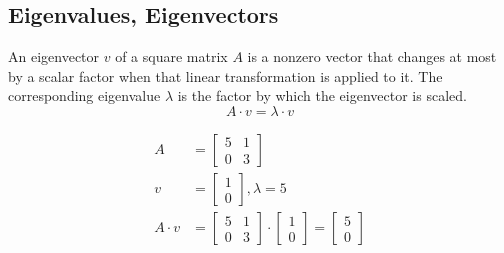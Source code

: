 \subsection{Eigenvalues, Eigenvectors}\label{eigen}
An eigenvector \( v \) of a square matrix \(A\) is a nonzero vector that changes at most by a scalar factor when that linear transformation is applied to it. The corresponding eigenvalue $\lambda$ is the factor by which the eigenvector is scaled.
\begin{equation} \label{eigenexpression}
    A\cdot v = \lambda \cdot v
\end{equation}
\begin{example}
    \begin{align*}
        A         & = \begin{bmatrix}
            5 & 1 \\ 0 & 3
        \end{bmatrix}                                                                 \\
        v         & = \begin{bmatrix}
            1 \\ 0
        \end{bmatrix}, \lambda = 5                                                    \\
        A \cdot v & = \begin{bmatrix}
            5 & 1 \\ 0 & 3
        \end{bmatrix} \cdot \begin{bmatrix}
            1 \\ 0
        \end{bmatrix} = \begin{bmatrix}
            5 \\ 0
        \end{bmatrix}
    \end{align*}
\end{example}
